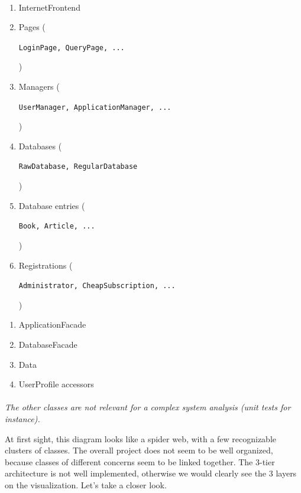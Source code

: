 \paragraph*{}
\begin{minipage}{0.6\textwidth}
  \begin{enumerate}
    \item InternetFrontend
    \item Pages (\begin{scriptsize}\texttt{LoginPage, QueryPage, ...}\end{scriptsize})
    \item Managers (\begin{scriptsize}\texttt{UserManager, ApplicationManager, ...}\end{scriptsize})
    \item Databases (\begin{scriptsize}\texttt{RawDatabase, RegularDatabase}\end{scriptsize})
    \item Database entries (\begin{scriptsize}\texttt{Book, Article, ...}\end{scriptsize})
    \item Registrations (\begin{scriptsize}\texttt{Administrator, CheapSubscription, ...}\end{scriptsize})
  \end{enumerate}
\end{minipage}\hfill
\begin{minipage}{0.3\textwidth}
  \begin{enumerate}[label=\alph*]
    \item ApplicationFacade
    \item DatabaseFacade
    \item Data
    \item UserProfile accessors
  \end{enumerate}
\end{minipage}

\paragraph*{}\textit{The other classes are not relevant for a complex system analysis (unit tests for instance).}

At first sight, this diagram looks like a spider web, with a few recognizable clusters of classes. The overall project does not seem to be well organized, because classes of different concerns seem to be linked together. The 3-tier architecture is not well implemented, otherwise we would clearly see the 3 layers on the visualization. Let's take a closer look.

